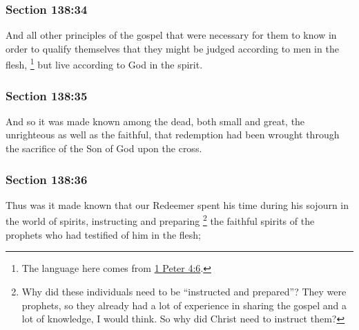 	\subsubsection{Section 138:34} %
		\label{DC138-34}

		And all other principles of the gospel that were necessary for them to know in order to qualify themselves that they might be judged according to men in the flesh,%
			\footnote{%
				The language here comes from \hyperref[1PETER-4-6]{1 Peter 4:6}.
				}
		but live according to God in the spirit.


	\subsubsection{Section 138:35} %
		\label{DC138-35}

		And so it was made known among the dead, both small and great, the unrighteous as well as the faithful, that redemption had been wrought through the sacrifice of the Son of God upon the cross.


	\subsubsection{Section 138:36} %
		\label{DC138-36}

		Thus was it made known that our Redeemer spent his time during his sojourn in the world of spirits, instructing and preparing%
			\footnote{%
				Why did these individuals need to be ``instructed and prepared''? They were prophets, so they already had a lot of experience in sharing the gospel and a lot of knowledge, I would think. So why did Christ need to instruct them?
				}
		the faithful spirits of the prophets who had testified of him in the flesh;

